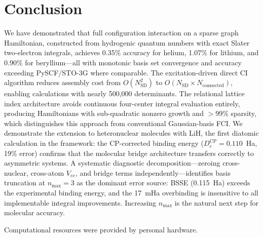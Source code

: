 \documentclass[aps,pra,twocolumn,superscriptaddress,longbibliography,floatfix]{revtex4-2}
\begin{document}
\section{Conclusion}
\label{sec:conclusion}

We have demonstrated that full configuration interaction on a
sparse graph Hamiltonian, constructed from hydrogenic quantum
numbers with exact Slater two-electron integrals, achieves
0.35\% accuracy for helium, 1.07\% for lithium, and 0.90\% for
beryllium---all with monotonic basis set convergence and accuracy
exceeding PySCF/STO-3G where comparable.
The excitation-driven direct CI algorithm reduces assembly cost
from $O(N_{\text{SD}}^2)$ to $O(N_{\text{SD}} \times N_{\text{connected}})$,
enabling calculations with nearly 500{,}000 determinants.
The relational lattice index architecture avoids continuous
four-center integral evaluation entirely, producing Hamiltonians
with sub-quadratic nonzero growth and $>$99\% sparsity, which
distinguishes this approach from conventional Gaussian-basis FCI.
We demonstrate the extension to heteronuclear molecules with LiH,
the first diatomic calculation in the framework: the CP-corrected
binding energy ($D_e^{\text{CP}} = 0.110$~Ha, 19\% error) confirms
that the molecular bridge architecture transfers correctly to
asymmetric systems. A systematic diagnostic decomposition---zeroing cross-nuclear,
cross-atom $V_{ee}$, and bridge terms independently---identifies basis
truncation at $n_{\max}=3$ as the dominant error source: BSSE (0.115~Ha)
exceeds the experimental binding energy, and the 17~mHa overbinding is
insensitive to all implementable integral improvements. Increasing
$n_{\max}$ is the natural next step for molecular accuracy.

\begin{acknowledgments}
Computational resources were provided by personal hardware.
\end{acknowledgments}
\end{document}
